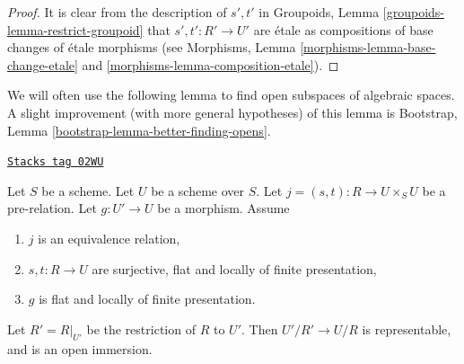\begin{proof}
It is clear from the description of $s', t'$ in
Groupoids, Lemma \ref{groupoids-lemma-restrict-groupoid}
that $s' , t' : R' \to U'$ are \'etale
as compositions of base changes of \'etale morphisms
(see Morphisms, Lemma \ref{morphisms-lemma-base-change-etale}
and \ref{morphisms-lemma-composition-etale}).
\end{proof}

We will often use the following lemma to find open subspaces of algebraic
spaces. A slight improvement (with more general hypotheses) of this lemma is
Bootstrap, Lemma \ref{bootstrap-lemma-better-finding-opens}.

\begin{lemma}
\label{spaces-lemma-finding-opens}
\href{https://stacks.math.columbia.edu/tag/02WU}{\texttt{Stacks tag 02WU}}

Let $S$ be a scheme.
Let $U$ be a scheme over $S$.
Let $j = (s, t) : R \to U \times_S U$ be a pre-relation.
Let $g : U' \to U$ be a morphism.
Assume
\begin{enumerate}
\item $j$ is an equivalence relation,
\item $s, t : R \to U$ are surjective, flat and
locally of finite presentation,
\item $g$ is flat and locally of finite presentation.
\end{enumerate}
Let $R' = R|_{U'}$ be the restriction of $R$ to $U'$. Then
$U'/R' \to U/R$ is representable, and is an open immersion.
\end{lemma}

